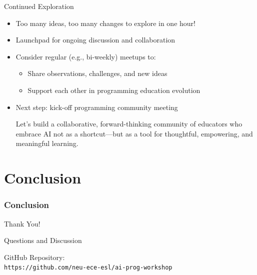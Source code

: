 \documentclass[xcolor={dvipsnames,table}, aspectratio=169]{beamer}
\newcommand{\footername}{AI in Programming Education}
\newcommand{\setfooter}[2]{\renewcommand{\footername}{\href{#2}{#1}}}
\begin{document}
\begin{frame}{Continued Exploration}
  \begin{itemize}
    \item Too many ideas, too many changes to explore in one hour!
    \item Launchpad for ongoing discussion and collaboration
    \item Consider regular (e.g., bi-weekly) meetups to:
      \begin{itemize}
        \item Share observations, challenges, and new ideas
        \item Support each other in programming education evolution
      \end{itemize}
    \item Next step: kick-off programming community meeting
    \vspace{3em}
    \begin{infobox}
      Let's build a collaborative, forward-thinking community of educators who embrace AI not as a shortcut—but as a tool for thoughtful, empowering, and meaningful learning.
    \end{infobox}
  \end{itemize}
\end{frame}

\part[Conclusion]{Conclusion}
\section{Conclusion}
\setfooter{Conclusion}{https://github.com/neu-ece-esl/ai-prog-workshop}
 

\begin{frame}{Thank You!}
  \begin{center}
    \Large{Questions and Discussion}
    
    \vspace{2em}
    
    GitHub Repository:\\
    \texttt{https://github.com/neu-ece-esl/ai-prog-workshop}
  \end{center}
\end{frame}
\end{document}
